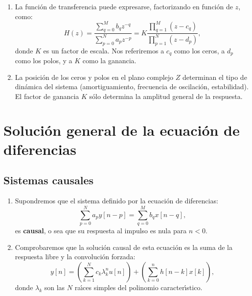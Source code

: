 \begin{enumerate}
	\item La funci\'{o}n de transferencia puede expresarse, factorizando en función de $z$, como:
	\begin{equation}
		H(z) = \frac{\sum_{q=0}^{M}b_{q}z^{-q}}{\sum_{p=0}^{N}a_{p}z^{-p}} = K \frac{\prod_{q=1}^{M} (z-c_{q})}{\prod_{p=1}^{N} (z-d_{p})},
	\end{equation}
	donde $K$ es un factor de escala. Nos referiremos a $c_{q}$ como los ceros, a $d_{p}$ como los polos, y a $K$ como la ganancia.
	
	\item La posici\'{o}n de los ceros y polos en el plano complejo $Z$ determinan el tipo de din\'{a}mica del sistema (amortiguamiento, frecuencia de oscilación, estabilidad). El factor de ganancia $K$ s\'{o}lo determina la amplitud general de la respuesta.
\end{enumerate}

\section{Soluci\'{o}n general de la ecuaci\'{o}n de diferencias}

\subsection{Sistemas causales}

\begin{enumerate}
	\item Supondremos que el sistema definido por la ecuaci\'{o}n de diferencias:
	\begin{equation}
		\sum_{p=0}^{N}a_{p} y[n-p] = \sum_{q=0}^{M}b_{q} x[n-q], \label{eqdtdcausal}
	\end{equation}
	es \textbf{causal}, o sea que su respuesta al impulso es nula para $n < 0$.
	
	\item Comprobaremos que la soluci\'{o}n causal de esta ecuaci\'{o}n es la suma de la respuesta libre y la convolución forzada:
	\begin{equation}
		y[n] = \left( \sum_{k=1}^{N} c_{k} \lambda_{k}^{n} u[n] \right) + \left( \sum_{k=0}^{n} h[n-k] x[k] \right), \label{solgenecdif}
	\end{equation}
	donde $\lambda_{k}$ son las $N$ ra\'{\i}ces simples del polinomio caracter\'{\i}stico.
\end{enumerate}

